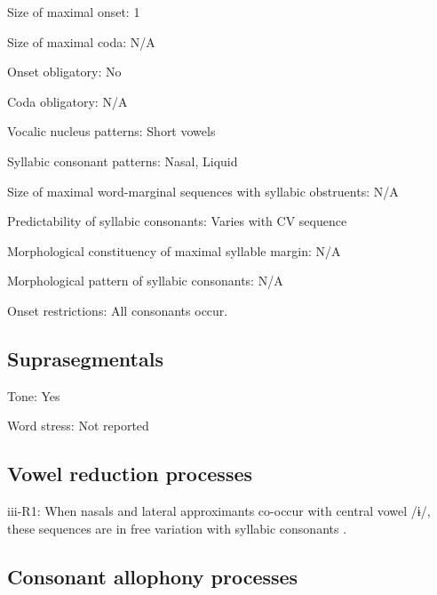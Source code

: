 {\begin{appendixdesc}
\item[Size of maximal onset:] 1

\item[Size of maximal coda:] N/A

\item[Onset obligatory:] No

\item[Coda obligatory:] N/A

\item[Vocalic nucleus patterns:] Short vowels

\item[Syllabic consonant patterns:] Nasal, Liquid

\item[Size of maximal word-marginal sequences with syllabic obstruents:] N/A

\item[Predictability of syllabic consonants:] Varies with CV sequence

\item[Morphological constituency of maximal syllable margin:] N/A

\item[Morphological pattern of syllabic consonants:] N/A

\item[Onset restrictions:] All consonants occur.
\end{appendixdesc}
\subsection*{Suprasegmentals}
\begin{appendixdesc}
\item[Tone:] Yes

\item[Word stress:] Not reported
\end{appendixdesc}
\subsection*{Vowel reduction processes}
\begin{appendixdesc}

\item[iii-R1:] When nasals and lateral approximants co-occur with central vowel /ɨ/, these sequences are in free variation with syllabic consonants \citep[31]{Gerner2013}.
\end{appendixdesc}
\subsection*{Consonant allophony processes}

}
